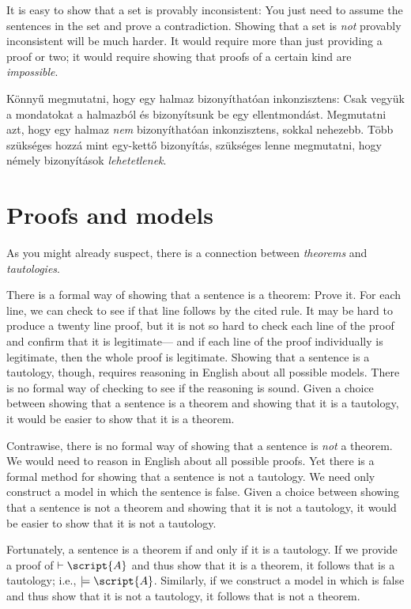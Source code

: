 It is easy to show that a set is provably inconsistent: You just need to assume the sentences in the set and prove a contradiction. Showing that a set is \emph{not} provably inconsistent will be much harder. It would require more than just providing a proof or two; it would require showing that proofs of a certain kind are \emph{impossible}.

Könnyű megmutatni, hogy egy halmaz bizonyíthatóan inkonzisztens: Csak vegyük a mondatokat a halmazból és bizonyítsunk be egy ellentmondást. Megmutatni azt, hogy egy halmaz \emph{nem} bizonyíthatóan inkonzisztens, sokkal nehezebb. Több szükséges hozzá mint egy-kettő bizonyítás, szükséges lenne megmutatni, hogy némely bizonyítások \emph{lehetetlenek}.






\section{Proofs and models}
As you might already suspect, there is a connection between \emph{theorems} and \emph{tautologies}.

There is a formal way of showing that a sentence is a theorem: Prove it. For each line, we can check to see if that line follows by the cited rule. It may be hard to produce a twenty line proof, but it is not so hard to check each line of the proof and confirm that it is legitimate--- and if each line of the proof individually is legitimate, then the whole proof is legitimate. Showing that a sentence is a tautology, though, requires reasoning in English about all possible models. There is no formal way of checking to see if the reasoning is sound. Given a choice between showing that a sentence is a theorem and showing that it is a tautology, it would be easier to show that it is a theorem.

Contrawise, there is no formal way of showing that a sentence is \emph{not} a theorem. We would need to reason in English about all possible proofs. Yet there is a formal method for showing that a sentence is not a tautology. We need only construct a model in which the sentence is false. Given a choice between showing that a sentence is not a theorem and showing that it is not a tautology, it would be easier to show that it is not a tautology.

Fortunately, a sentence is a theorem if and only if it is a tautology. If we provide a proof of $\vdash\script{A}$ and thus show that it is a theorem, it follows that  is a tautology; i.e., $\models\script{A}$. Similarly, if we construct a model in which  is false and thus show that it is not a tautology, it follows that  is not a theorem.

